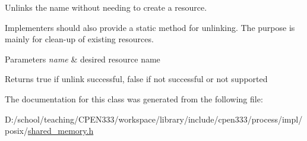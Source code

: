 Unlinks the name without needing to create a resource. 

Implementers should also provide a static method for unlinking. The purpose is mainly for clean-\/up of existing resources.


\begin{DoxyParams}{Parameters}
{\em name} & desired resource name \\
\hline
\end{DoxyParams}
\begin{DoxyReturn}{Returns}
{\ttfamily true} if unlink successful, {\ttfamily false} if not successful or not supported 
\end{DoxyReturn}


The documentation for this class was generated from the following file\+:\begin{DoxyCompactItemize}
\item 
D\+:/school/teaching/\+C\+P\+E\+N333/workspace/library/include/cpen333/process/impl/posix/\hyperlink{impl_2posix_2shared__memory_8h}{shared\+\_\+memory.\+h}\end{DoxyCompactItemize}
